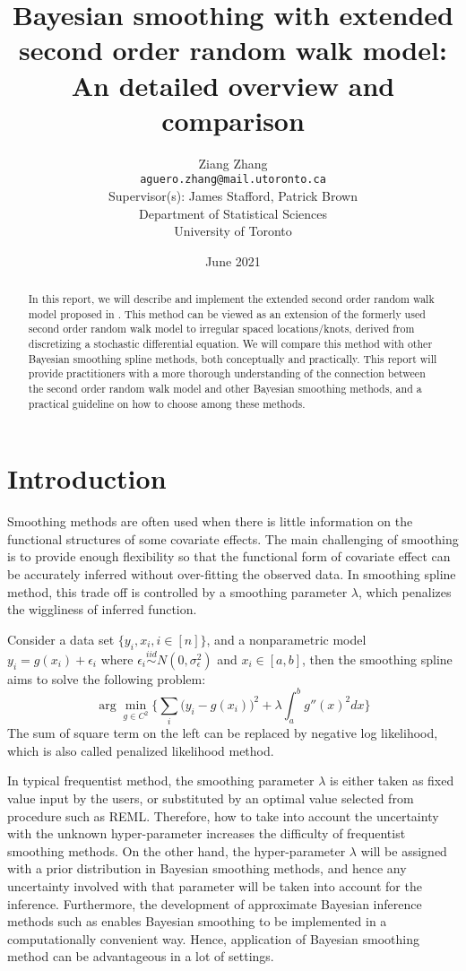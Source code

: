 \documentclass{article}
\title{\textbf{Bayesian smoothing with extended second order random walk model: An detailed overview and comparison}}
\author{
Ziang Zhang \\ \vspace{-0.3cm}\normalsize\texttt{aguero.zhang@mail.utoronto.ca}\\ 
\large
\vspace{0.5cm}
Supervisor(s): James Stafford, Patrick Brown \\ 

\vspace{0.5cm}
Department of Statistical Sciences \\
University of Toronto
}
\date{June 2021}
\begin{document}
\maketitle

\tableofcontents

\newpage

\begin{abstract}
In this report, we will describe and implement the extended second order random walk model proposed in \cite{rw2}. This method can be viewed as an extension of the formerly used second order random walk model to irregular spaced locations/knots, derived from discretizing a stochastic differential equation. We will compare this method with other Bayesian smoothing spline methods, both conceptually and practically. This report will provide practitioners with a more thorough understanding of the connection between the second order random walk model and other Bayesian smoothing methods, and a practical guideline on how to choose among these methods.
\end{abstract}




\section{Introduction}\label{intro}

Smoothing methods are often used when there is little information on the functional structures of some covariate effects. The main challenging of smoothing is to provide enough flexibility so that the functional form of covariate effect can be accurately inferred without over-fitting the observed data. In smoothing spline method, this trade off is controlled by a smoothing parameter $\lambda$, which penalizes the wiggliness of inferred function. 

Consider a data set $\{y_i,x_i, i\in [n]\}$, and a nonparametric model $y_i = g(x_i) + \epsilon_i$ where $\epsilon_i \overset{iid}\sim N(0,\sigma_\epsilon^2)$ and $x_i \in [a,b]$, then the smoothing spline aims to solve the following problem:
\begin{equation}\label{equ:ss}
\arg\min_{g\in C^2} \bigg\{ \sum_i\bigg(y_i-g(x_i)\bigg)^2 + \lambda\int_a^b g''(x)^2 dx \bigg\}
\end{equation}
The sum of square term on the left can be replaced by negative log likelihood, which is also called penalized likelihood method.

In typical frequentist method, the smoothing parameter $\lambda$ is either taken as fixed value input by the users, or substituted by an optimal value selected from procedure such as REML. Therefore, how to take into account the uncertainty with the unknown hyper-parameter increases the difficulty of frequentist smoothing methods. On the other hand, the hyper-parameter $\lambda$ will be assigned with a prior distribution in Bayesian smoothing methods, and hence any uncertainty involved with that parameter will be taken into account for the inference. Furthermore, the development of approximate Bayesian inference methods such as \cite{inla} enables Bayesian smoothing to be implemented in a computationally convenient way. Hence, application of Bayesian smoothing method can be advantageous in a lot of settings.
\end{document}
